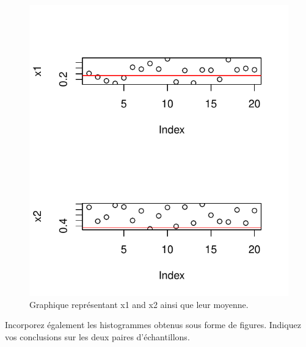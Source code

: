 \begin{figure}[htbp]
	\begin{center}
		\includegraphics[width=12cm]{diagrams/x1-x2-2.pdf}
		\caption{Graphique représentant x1 and x2 ainsi que leur moyenne.}
		\label{fig:x1-x2-2}
	\end{center}
\end{figure}


Incorporez également les histogrammes obtenus sous forme de figures. Indiquez vos conclusions sur les deux paires d'échantillons. 
